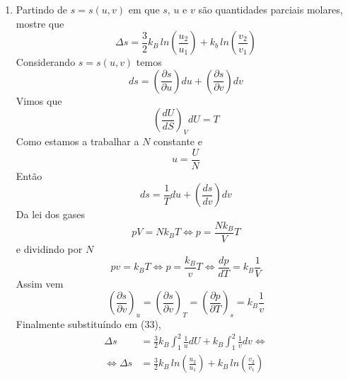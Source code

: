 \documentclass[12pt, twoside, a4paper]{article}
\begin{document}
\begin{enumerate}[1.]
  \item Partindo de $s=s(u,v)$ em que $s$, $u$ e $v$ são quantidades parciais molares, mostre que
  \begin{equation}
    \Delta s= \frac{3}{2}k_B\,ln\left(\frac{u_2}{u_1}\right)+k_b\,ln\left(\frac{v_2}{v_1}\right)
  \end{equation}
  Considerando $s=s(u,v)$ temos
  \begin{equation}
    ds=\left(\frac{\partial s}{\partial u}\right)du + \left(\frac{\partial s}{\partial v}\right)dv
  \end{equation}
  Vimos que
  \begin{equation}
    \left(\frac{dU}{dS}\right)_V dU = T
  \end{equation}
  Como estamos a trabalhar a $N$ constante e
  \begin{equation}
    u=\frac{U}{N}
  \end{equation}
  Então
  \begin{equation}
    ds=\frac{1}{T}du + \left(\frac{ds}{dv}\right)dv
  \end{equation}
  Da lei dos gases
  \begin{equation}
      pV=Nk_BT \iff p=\frac{Nk_B}{V}T
  \end{equation}
  e dividindo por $N$
  \begin{equation}
      pv=k_BT \iff p=\frac{k_B}{v}T \iff \frac{dp}{dT}=k_B\frac{1}{V}
  \end{equation}
  Assim vem
  \begin{equation}
    \left(\frac{\partial s}{\partial v}\right)_u = \left(\frac{\partial s}{\partial v}\right)_T = \left(\frac{\partial p}{\partial T}\right)_s = k_B \frac{1}{v}
  \end{equation}
  Finalmente substituíndo em (33),
  \begin{equation}
    \begin{split}
      \Delta s &= \frac{3}{2}k_B \int_1^2 \frac{1}{u}dU + k_B\int_1^2\frac{1}{v}dv \iff \\
      \iff \Delta s &=\frac{3}{2}k_B\,ln\left(\frac{u_2}{u_1}\right)+ k_B\,ln\left(\frac{v_2}{v_1}\right)
    \end{split}
  \end{equation}
\end{enumerate}
\end{document}
